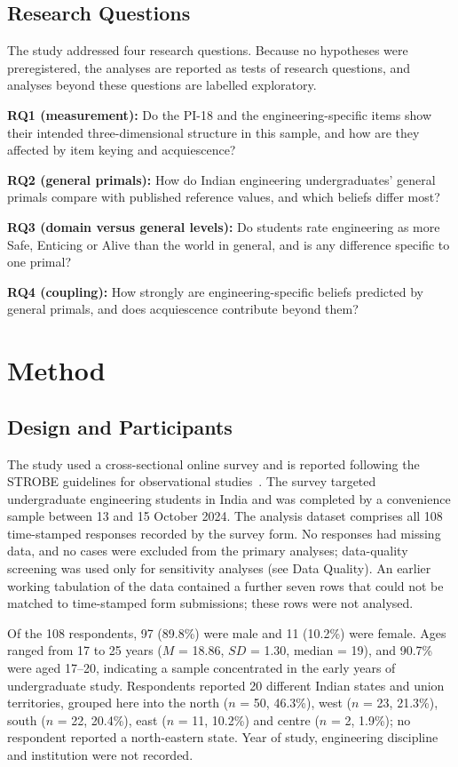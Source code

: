 \documentclass[journal,a4paper]{IEEEtran}
\begin{document}
\subsection{Research Questions}

The study addressed four research questions. Because no hypotheses were preregistered, the analyses are reported as tests of research questions, and analyses beyond these questions are labelled exploratory.

\textbf{RQ1 (measurement):} Do the PI-18 and the engineering-specific items show their intended three-dimensional structure in this sample, and how are they affected by item keying and acquiescence?

\textbf{RQ2 (general primals):} How do Indian engineering undergraduates' general primals compare with published reference values, and which beliefs differ most?

\textbf{RQ3 (domain versus general levels):} Do students rate engineering as more Safe, Enticing or Alive than the world in general, and is any difference specific to one primal?

\textbf{RQ4 (coupling):} How strongly are engineering-specific beliefs predicted by general primals, and does acquiescence contribute beyond them?

\section{Method}

\subsection{Design and Participants}

The study used a cross-sectional online survey and is reported following the STROBE guidelines for observational studies~\cite{vonelm2007}. The survey targeted undergraduate engineering students in India and was completed by a convenience sample between 13 and 15 October 2024. The analysis dataset comprises all 108 time-stamped responses recorded by the survey form. No responses had missing data, and no cases were excluded from the primary analyses; data-quality screening was used only for sensitivity analyses (see Data Quality). An earlier working tabulation of the data contained a further seven rows that could not be matched to time-stamped form submissions; these rows were not analysed.

Of the 108 respondents, 97 (89.8\%) were male and 11 (10.2\%) were female. Ages ranged from 17 to 25 years ($M$ = 18.86, $SD$ = 1.30, median = 19), and 90.7\% were aged 17–20, indicating a sample concentrated in the early years of undergraduate study. Respondents reported 20 different Indian states and union territories, grouped here into the north ($n$ = 50, 46.3\%), west ($n$ = 23, 21.3\%), south ($n$ = 22, 20.4\%), east ($n$ = 11, 10.2\%) and centre ($n$ = 2, 1.9\%); no respondent reported a north-eastern state. Year of study, engineering discipline and institution were not recorded.
\end{document}
